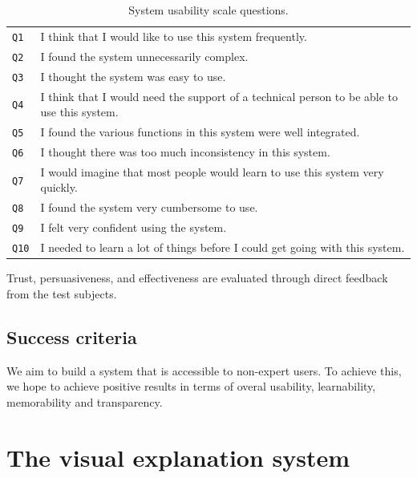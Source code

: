 \begin{table}
	\caption{System usability scale questions.}
	\begin{tabular}{ p{20px} | p{410px} }
		\hline
		\texttt{Q1} 	&	I think that I would like to use this system frequently. \\
		\texttt{Q2}		&	I found the system unnecessarily complex. \\
		\texttt{Q3}		&	I thought the system was easy to use. \\
		\texttt{Q4} 	&	I think that I would need the support of a technical person to be able to use this system. \\
		\texttt{Q5}		&	I found the various functions in this system were well integrated. \\
		\texttt{Q6}		&	I thought there was too much inconsistency in this system. \\
		\texttt{Q7} 	&	I would imagine that most people would learn to use this system very quickly.  \\
		\texttt{Q8}		&	I found the system very cumbersome to use. \\
		\texttt{Q9}		& I felt very confident using the system. \\
		\texttt{Q10}	& I needed to learn a lot of things before I could get going with this system. \\
		\hline
	\end{tabular}
	\label{table:sus_questions}
\end{table}

Trust, persuasiveness, and effectiveness are evaluated through direct feedback from the test subjects.


\subsection{Success criteria}\label{introduction:objective:criteria}

We aim to build a system that is accessible to non-expert users. To achieve this, we hope to achieve positive results in terms of overal usability, learnability, memorability and transparency.




\section{The visual explanation system}\label{chapter:introduction:section:application}

